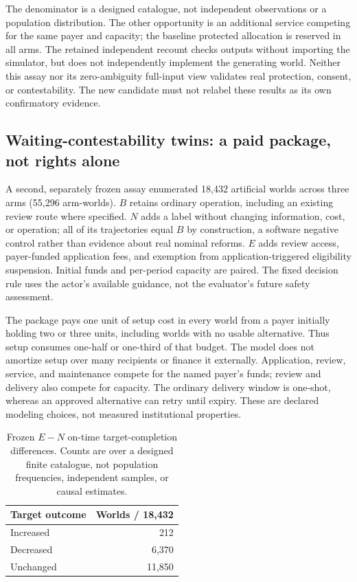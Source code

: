 \documentclass[11pt,a4paper]{article}
\numberwithin{equation}{section}
\theoremstyle{definition}
\theoremstyle{plain}
\theoremstyle{remark}
\begin{document}
The denominator is a designed catalogue, not independent observations or a population distribution. The other opportunity is an additional service competing for the same payer and capacity; the baseline protected allocation is reserved in all arms. The retained independent recount checks outputs without importing the simulator, but does not independently implement the generating world. Neither this assay nor its zero-ambiguity full-input view validates real protection, consent, or contestability. The new candidate must not relabel these results as its own confirmatory evidence.

\subsection{Waiting-contestability twins: a paid package, not rights alone}
\label{sec:waitingresults}

A second, separately frozen assay enumerated 18,432 artificial worlds across three arms (55,296 arm-worlds). $B$ retains ordinary operation, including an existing review route where specified. $N$ adds a label without changing information, cost, or operation; all of its trajectories equal $B$ by construction, a software negative control rather than evidence about real nominal reforms. $E$ adds review access, payer-funded application fees, and exemption from application-triggered eligibility suspension. Initial funds and per-period capacity are paired. The fixed decision rule uses the actor's available guidance, not the evaluator's future safety assessment.

The package pays one unit of setup cost in every world from a payer initially holding two or three units, including worlds with no usable alternative. Thus setup consumes one-half or one-third of that budget. The model does not amortize setup over many recipients or finance it externally. Application, review, service, and maintenance compete for the named payer's funds; review and delivery also compete for capacity. The ordinary delivery window is one-shot, whereas an approved alternative can retry until expiry. These are declared modeling choices, not measured institutional properties.

\begin{table}[H]
\centering\small
\caption{Frozen $E-N$ on-time target-completion differences. Counts are over a designed finite catalogue, not population frequencies, independent samples, or causal estimates.}
\label{tab:waitingresults}
\begin{tabular}{@{}lr@{}}
\toprule
\textbf{Target outcome} & \textbf{Worlds / 18,432}\\
\midrule
Increased & 212\\
Decreased & 6,370\\
Unchanged & 11,850\\
\bottomrule
\end{tabular}
\end{table}
\end{document}
